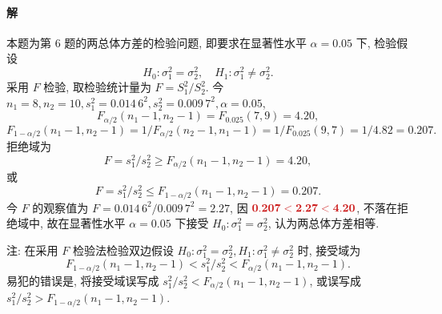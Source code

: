 \documentclass[11pt, UTF8]{ctexart}
\newcommand{\ans}[1]{\mathbf{\color{fred}#1}}
\begin{document}
\paragraph{\color{fblue}解} 
本题为第 6 题的两总体方差的检验问题, 即要求在显著性水平 $\alpha=0.05$ 下, 检验假设
\[ H_0: \sigma_1^2 = \sigma_2^2, \quad H_1: \sigma_1^2 \neq \sigma_2^2. \]
采用 $F$ 检验, 取检验统计量为 $F = S_1^2 / S_2^2$. 今 $n_1 = 8, n_2 = 10, s_1^2 = 0.014\,6^2, s_2^2 = 0.009\,7^2, \alpha = 0.05$, 
\[ F_{\alpha/2}(n_1-1, n_2-1) = F_{0.025}(7,9) = 4.20, \]
\[ F_{1-\alpha/2}(n_1-1, n_2-1) = 1/F_{\alpha/2}(n_2-1, n_1-1) = 1/F_{0.025}(9,7) = 1/4.82 = 0.207. \]
拒绝域为
\[ F = s_1^2/s_2^2 \geqslant F_{\alpha/2}(n_1-1, n_2-1) = 4.20, \]
或
\[ F = s_1^2/s_2^2 \leqslant F_{1-\alpha/2}(n_1-1, n_2-1) = 0.207. \]
今 $F$ 的观察值为 $F = 0.014\,6^2 / 0.009\,7^2 = 2.27$, 因 $\ans{0.207 < 2.27 < 4.20}$, 不落在拒绝域中, 故在显著性水平 $\alpha=0.05$ 下接受 $H_0: \sigma_1^2 = \sigma_2^2$, 认为两总体方差相等.

注: 在采用 $F$ 检验法检验双边假设 $H_0: \sigma_1^2 = \sigma_2^2, H_1: \sigma_1^2 \neq \sigma_2^2$ 时, 接受域为
\[ F_{1-\alpha/2}(n_1-1, n_2-1) < s_1^2/s_2^2 < F_{\alpha/2}(n_1-1, n_2-1). \]
易犯的错误是, 将接受域误写成 $s_1^2/s_2^2 < F_{\alpha/2}(n_1-1, n_2-1)$, 或误写成 $s_1^2/s_2^2 > F_{1-\alpha/2}(n_1-1, n_2-1)$.
\end{document}
